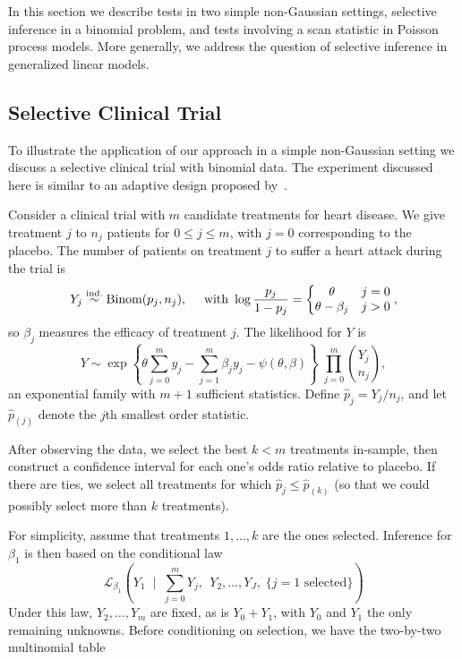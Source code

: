 \documentclass{article}
\theoremstyle{definition}
\newcommand{\Gv}{\;\;\big|\;\;}
\newcommand{\cL}{\mathcal{L}}
\begin{document}
In this section we describe tests in two simple non-Gaussian settings, selective inference in a binomial problem, and tests involving a scan statistic in Poisson process models. More generally, we address the question of selective inference in generalized linear models.

\subsection{Selective Clinical Trial}\label{sec:clinical}

To illustrate the application of our approach in a simple non-Gaussian setting we discuss a selective clinical trial with binomial data. The experiment discussed here is similar to an adaptive design proposed by~\citet{sill2009drop}.

Consider a clinical trial with $m$ candidate treatments for heart disease. We give treatment $j$ to $n_j$ patients for $0 \leq j \leq m$, with $j=0$ corresponding to the placebo. The number of patients on treatment $j$ to suffer a heart attack during the trial is
\begin{equation}
  Y_j \overset{\textrm{ind.}}{\sim} \text{Binom}(p_j, n_j), \quad \text{ with }   \log \frac{p_j}{1-p_j} = \left\{\begin{matrix} \theta & j = 0\\ \theta - \beta_j & j > 0\end{matrix}\right. ,
\end{equation}
so $\beta_j$ measures the efficacy of treatment $j$. The likelihood for $Y$ is
\begin{equation}
  Y \sim \exp\left\{\theta \sum_{j=0}^m y_j - \sum_{j=1}^m \beta_j y_j
    - \psi(\theta, \beta) \right\}\;\prod_{j=0}^m\binom{Y_j}{n_j},
\end{equation}
an exponential family with $m+1$ sufficient statistics. Define $\hat p_j = Y_j/n_j$, and let $\hat p_{(j)}$ denote the $j$th smallest order statistic.

After observing the data, we select the best $k<m$ treatments in-sample, then construct a confidence interval for each one's odds ratio relative to placebo. If there are ties, we select all treatments for which $\hat p_j \leq \hat p_{(k)}$ (so that we could possibly select more than $k$ treatments).

For simplicity, assume that treatments $1,\ldots,k$ are the ones selected. Inference for $\beta_1$ is then based on the conditional law
\begin{equation}
  \cL_{\beta_1}\left( Y_1  \Gv
    \sum_{j=0}^m Y_j,\;\, Y_2, \ldots, Y_J, \;
     \{j=1 \text{ selected}\}\right)
\end{equation}
Under this law, $Y_2,\ldots,Y_m$ are fixed, as is $Y_0+Y_1$, with $Y_0$ and $Y_1$ the only remaining unknowns. Before conditioning on selection, we have the two-by-two multinomial table
\end{document}
